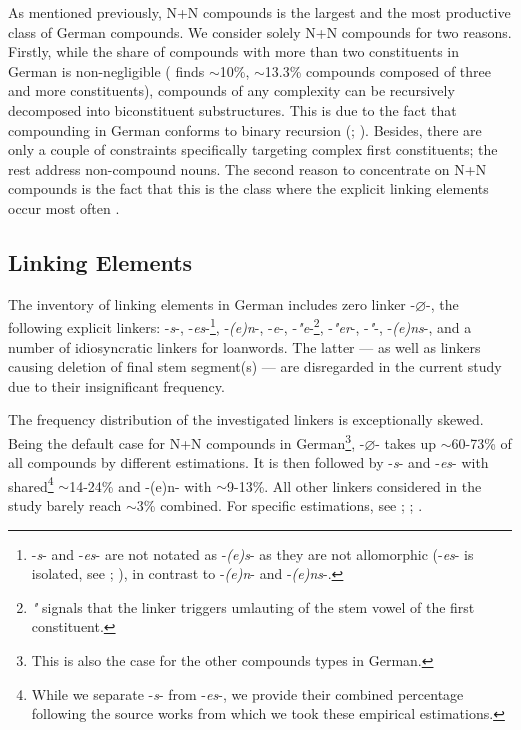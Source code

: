 \documentclass[10pt, a4paper]{article}
\newcommand{\zeroLinker}{\ensuremath{\boldsymbol{\varnothing}}}
\begin{document}
As mentioned previously, N+N compounds is the largest and the most productive class of German compounds. We consider solely N+N compounds for two reasons. Firstly, while the share of compounds with more than two constituents in German is non-negligible (\citealp[297]{augst_1975} finds $\sim$10\%, \citealp[13-30]{ortner_mueller-bollhagen_1991} $\sim$13.3\% compounds composed of three and more constituents), compounds of any complexity can be recursively decomposed into biconstituent substructures. This is due to the fact that compounding in German conforms to binary recursion (\citealp[219]{eisenberg_2013}; \citealp[226-227]{schaefer_2018}). Besides, there are only a couple of constraints specifically targeting complex first constituents; the rest address non-compound nouns. The second reason to concentrate on N+N compounds is the fact that this is the class where the explicit linking elements occur most often \citep{schluecker_2023}.


\subsection{Linking Elements}
\label{sec:linkers}

The inventory of linking elements in German includes zero linker -{\zeroLinker}-, the following explicit linkers: -\textit{s}-, -\textit{es}-\footnote{-\textit{s}- and -\textit{es}- are not notated as -\textit{(e)s}- as they are not allomorphic (-\textit{es}- is isolated, see \citealp[229]{eisenberg_2013}; \citealp{kuerschner_2010}), in contrast to -\textit{(e)n}- and -\textit{(e)ns}-.}, -\textit{(e)n}-, -\textit{e}-, -\textit{"e}-\footnote{\textit{"} signals that the linker triggers umlauting of the stem vowel of the first constituent.}, -\textit{"er}-, -\textit{"}-, -\textit{(e)ns}-, and a number of idiosyncratic linkers for loanwords. The latter --- as well as linkers causing deletion of final stem segment(s) --- are disregarded in the current study due to their insignificant frequency.

The frequency distribution of the investigated linkers is exceptionally skewed. Being the default case for N+N compounds in German\footnote{This is also the case for the other compounds types in German.}, -{\zeroLinker}- takes up $\sim$60-73\% of all compounds by different estimations. It is then followed by -\textit{s}- and -\textit{es}- with shared\footnote{While we separate -\textit{s}- from -\textit{es}-, we provide their combined percentage following the source works from which we took these empirical estimations.} $\sim$14-24\% and -(e)n- with $\sim$9-13\%. All other linkers considered in the study barely reach $\sim$3\% combined. For specific estimations, see \citealt{krott_etal_2007}; \citet[54]{ortner_mueller-bollhagen_1991}; \citet[229]{schaefer_2018}.
\end{document}
